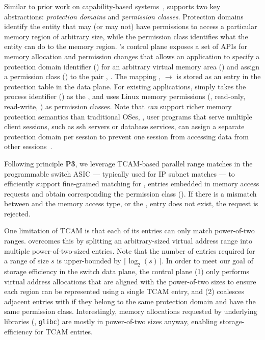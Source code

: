  Similar to prior work on capability-based systems~\cite{cheri, capabilityaddr}, \mind supports two key abstractions: \textit{protection domains} and \textit{permission classes}. Protection domains identify the entity that may (or may not) have permissions to access a particular memory region of arbitrary size, while the permission class identifies what the entity can do to the memory region. 
\mind's control plane exposes a set of APIs for memory allocation and permission changes that allows an application to specify a protection domain identifier () for an arbitrary virtual memory area () and assign a permission class () to the pair , . 
The mapping ,  $\rightarrow$  is stored as an entry in the protection table in the data plane. For existing applications, \mind simply takes the process identifier () as the ,  and uses Linux memory permissions (\eg, read-only, read-write, \etc) as permission classes. Note that \mind \textit{can} support richer memory protection semantics than traditional OSes, \eg, user programs that serve multiple client sessions, such as ssh servers or database services, can assign a separate protection domain per session to prevent one session from accessing data from other sessions~\cite{cheri}. 

Following principle \textbf{P3}, we leverage TCAM-based parallel range matches in the programmable switch ASIC --- typically used for IP subnet matches --- to efficiently support fine-grained matching for ,  entries embedded in memory access requests and obtain corresponding the permission class (). If there is a mismatch between  and the memory access type, or the ,  entry does not exist, the request is rejected.

 One limitation of TCAM is that each of its entries can only match power-of-two ranges. \mind overcomes this by splitting an arbitrary-sized virtual address range into multiple power-of-two-sized entries. Note that the number of entries required for a range of size $s$ is upper-bounded by $\lceil\log_2(s)\rceil$. In order to meet our goal of storage efficiency in the switch data plane, the control plane (1) only performs virtual address allocations that are aligned with the power-of-two sizes to ensure each region can be represented using a single TCAM entry, and (2) coalesces adjacent entries with if they belong to the same protection domain and have the same permission class. Interestingly, memory allocations requested by underlying libraries (\eg, \texttt{glibc}) are mostly in power-of-two sizes anyway, enabling storage-efficiency for TCAM entries.


